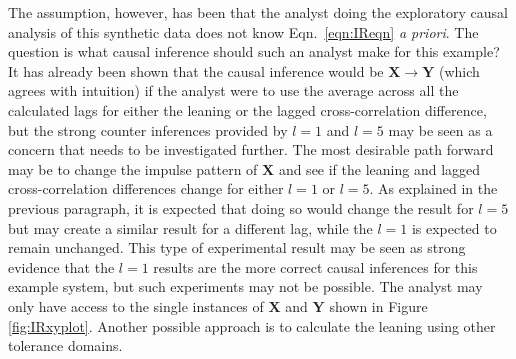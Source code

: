 \documentclass{article}[10pt]
\begin{document}
The assumption, however, has been that the analyst doing the exploratory causal analysis of this synthetic data does not know Eqn.\ \ref{eqn:IReqn} {\em a priori}.  The question is what causal inference should such an analyst make for this example?  It has already been shown that the causal inference would be $\mathbf{X}\rightarrow\mathbf{Y}$ (which agrees with intuition) if the analyst were to use the average across all the calculated lags for either the leaning or the lagged cross-correlation difference, but the strong counter inferences provided by $l=1$ and $l=5$ may be seen as a concern that needs to be investigated further.  The most desirable path forward may be to change the impulse pattern of $\mathbf{X}$ and see if the leaning and lagged cross-correlation differences change for either $l=1$ or $l=5$.  As explained in the previous paragraph, it is expected that doing so would change the result for $l=5$ but may create a similar result for a different lag, while the $l=1$ is expected to remain unchanged.  This type of experimental result may be seen as strong evidence that the $l=1$ results are the more correct causal inferences for this example system, but such experiments may not be possible.  The analyst may only have access to the single instances of $\mathbf{X}$ and $\mathbf{Y}$ shown in Figure \ref{fig:IRxyplot}.  Another possible approach is to calculate the leaning using other tolerance domains.
\end{document}
